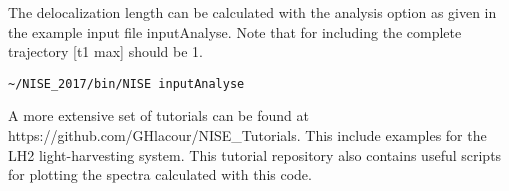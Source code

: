 The delocalization length \cite{Thouless.1974.PR.13.93} can be calculated with the analysis option as given in 
the example input file inputAnalyse. Note that for including the complete trajectory [t1 
max] should be 1. 
\begin{verbatim}
~/NISE_2017/bin/NISE inputAnalyse 
\end{verbatim}

A more extensive set of tutorials can be found at https://github.com/GHlacour/NISE\_Tutorials. This include examples for the LH2 light-harvesting system.
This tutorial repository also contains useful scripts for plotting the spectra calculated with this code.
